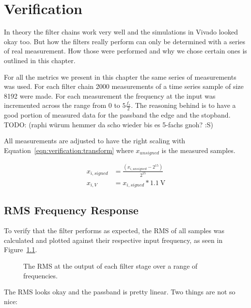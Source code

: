 \chapter{Verification}
\label{ch:verification}

In theory the filter chains work very well and the simulations in Vivado looked okay too.
But how the filters really perform can only be determined with a series of real measurement.
How those were performed and why we chose certain ones is outlined in this chapter.

For all the metrics we present in this chapter the same series of measurements was used.
For each filter chain 2000 measurements of a time series sample of size 8192 were made.
For each measurement the frequency at the input was incremented across the range from 0 to $5\frac{f_s}{2}$.
The reasoning behind is to have a good portion of measured data for the passband the edge and the stopband.
TODO: (raphi würum hemmer da scho wieder bis es 5-fachs gnoh? :S)

All measurements are adjusted to have the right scaling with Equation~\ref{eqn:verification:transform} where $x_{unsigned}$ is the measured samples.

\begin{align}
    \label{eqn:verification:transform}
    x_{i,signed} &= \frac{(x_{i,unsigned} - 2^{15})}{2^{15}}\\
    x_{i,V} &= x_{i,signed} * \SI{1.1}{\V}
\end{align}

\section{RMS Frequency Response}
\label{sec:verification:rms}

To verify that the filter performs as expected, the RMS of all samples was calculated and plotted against their respective input frequency, as seen in Figure~\ref{fig:verification:rmsAll}.

\begin{figure}
    \centering
    
    \caption[The RMS at the output of each filter stage over a range of frequencies.]{%
        The RMS at the output of each filter stage over a range of frequencies.%
    }
    \label{fig:verification:rmsAll}
\end{figure}

The RMS looks okay and the passband is pretty linear. Two things are not so nice:

